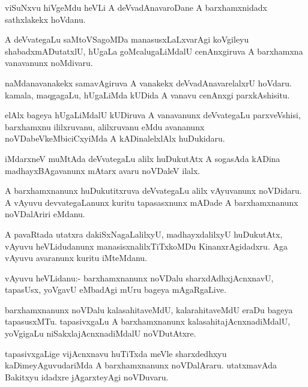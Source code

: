 \documentclass{article}
\begin{document}
\begin{mn}
viSuNxvu hiVgeMdu heVLi A deVvadAnavaroDane A barxhamxnidadx
sathxlakekx hoVdanu.
\end{mn}

\begin{mn}
A deVvategaLu saMtoVSagoMDa manasusxLaLxvarAgi koVgileyu
shabadxmADutatxlU, hUgaLa goMcalugaLiMdalU cenAnxgiruva A barxhamxna
vanavanunx noMdivaru.
\end{mn}

\begin{mn}
naMdanavanakekx samavAgiruva A vanakekx deVvadAnavarelalxrU
hoVdaru. kamala, maqgagaLu, hUgaLiMda kUDida A vanavu cenAnxgi parxkAshisitu.
\end{mn}

\begin{mn}
elAlx bageya hUgaLiMdalU kUDiruva A vanavanunx deVvategaLu
parxveVshisi, barxhamxnu ililxruvanu, alilxruvanu eMdu avananunx
noVDabeVkeMbiciCxyiMda A kADinalelxlAlx huDukidaru.
\end{mn}

\begin{mn}%
iMdarxneV muMtAda deVvategaLu alilx huDukutAtx A sogasAda kADina
madhayxBAgavanunx mAtarx avaru noVDaleV ilalx.
\end{mn}

\begin{mn}
A barxhamxnanunx huDukutitxruva deVvategaLu alilx vAyuvanunx
noVDidaru. A vAyuvu devvategaLanunx kuritu tapasasxnunx mADade A
barxhamxnanunx noVDalAriri eMdanu.
\end{mn}

\begin{mn}%
A pavaRtada utatxra dakiSxNagaLalilxyU, madhayxdalilxyU huDukutAtx,
vAyuvu heVLidudanunx manasisxnalilxTiTxkoMDu KinanxrAgidadxru. Aga
vAyuvu avaranunx kuritu iMteMdanu.
\end{mn}

\begin{mn}%
vAyuvu heVLidanu:- barxhamxnanunx noVDalu sharxdAdhxjAcnxnavU,
tapasUsx, yoVgavU eMbadAgi mUru bageya mAgaRgaLive.
\end{mn}

\begin{mn}
barxhamxnanunx noVDalu kalasahitaveMdU, kalarahitaveMdU eraDu bageya
tapasusxMTu. tapasivxgaLu A barxhamxnanunx kalasahitajAcnxnadiMdalU,
yoVgigaLu niSakxlajAcnxnadiMdalU noVDutAtxre.
\end{mn}

\begin{mn}%
tapasivxgaLige vijAcnxnavu huTiTxda meVle sharxdedhxyu
kaDimeyAguvudariMda A barxhamxnanunx noVDalAraru. utatxmavAda Bakitxyu
idadxre jAgarxteyAgi noVDuvaru.
\end{mn}
\end{document}
